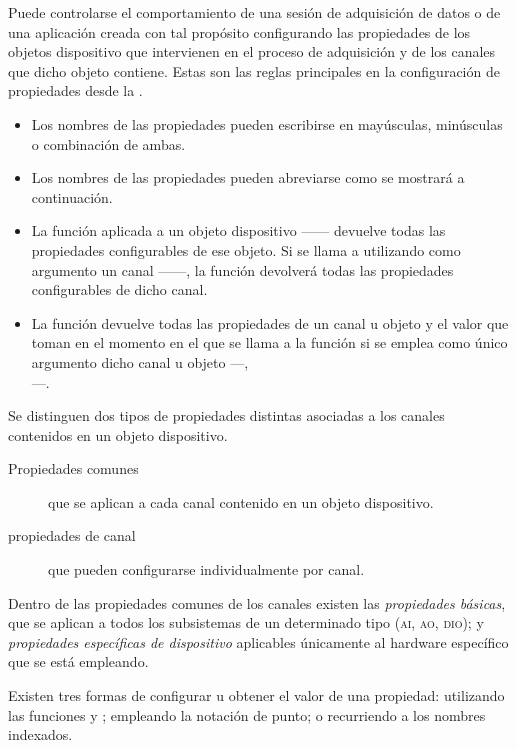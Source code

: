 Puede controlarse el comportamiento de una sesión de adquisición de datos o de una aplicación creada con tal propósito configurando las propiedades de los objetos dispositivo que intervienen en el proceso de adquisición y de los canales que dicho objeto contiene. Estas son las reglas principales en la configuración de propiedades desde la \datx{}.

\begin{itemize}
	\item Los nombres de las propiedades pueden escribirse en mayúsculas, minúsculas o combinación de ambas.
	\item Los nombres de las propiedades pueden abreviarse como se mostrará a continuación. %
	\item La función  aplicada a un objeto dispositivo ------ devuelve todas las propiedades configurables de ese objeto. Si se llama a  utilizando como argumento un canal ------, la función devolverá todas las propiedades configurables de dicho canal.
	\item La función  devuelve todas las propiedades de un canal u objeto y el valor que toman en el momento en el que se llama a la función si se emplea como único argumento dicho canal u objeto ---, \\ ---.
\end{itemize}

Se distinguen dos tipos de propiedades distintas asociadas a los canales contenidos en un objeto dispositivo.

\begin{description}
	\item[Propiedades comunes] que se aplican a cada canal contenido en un objeto dispositivo.
	\item[propiedades de canal] que pueden configurarse individualmente por canal.
\end{description}

Dentro de las propiedades comunes de los canales existen las \emph{propiedades básicas}, que se aplican a todos los subsistemas de un determinado tipo (\textsc{ai, ao, dio}); y \emph{propiedades específicas de dispositivo} aplicables únicamente al hardware específico que se está empleando.\par
Existen tres formas de configurar u obtener el valor de una propiedad: utilizando las funciones  y ; empleando la notación de punto; o recurriendo a los nombres indexados.

